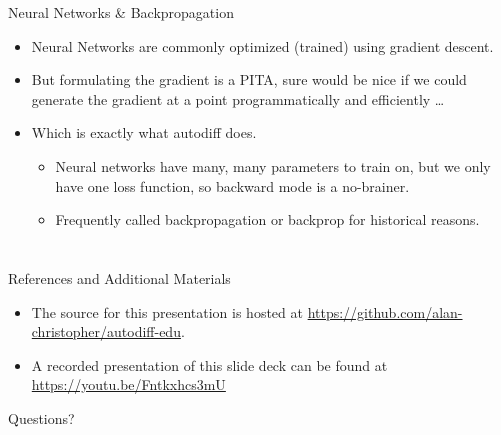 \documentclass[pdf]{beamer}
\makeatletter
\def\beamer@writeslidentry@miniframesoff{%
  \expandafter\beamer@ifempty\expandafter{\beamer@framestartpage}{}%
  {%
    \clearpage\beamer@notesactions%
  }
}
\newcommand*{\miniframesoff}{\let\beamer@writeslidentry=\beamer@writeslidentry@miniframesoff}
\makeatother
\begin{document}
\begin{frame}{Neural Networks \& Backpropagation}
  \begin{itemize}
  \item Neural Networks are commonly optimized (trained) using gradient descent.
    \pause
  \item But formulating the gradient is a PITA, sure would be nice if we could
    generate the gradient at a point programmatically and efficiently \ldots
    \pause
  \item Which is exactly what autodiff does.
    \begin{itemize}
    \item Neural networks have many, many parameters to train on, but we only
      have one loss function, so backward mode is a no-brainer.
    \item Frequently called backpropagation or backprop for historical reasons.
    \end{itemize}
  \end{itemize}
\end{frame}

\miniframesoff
\section*{}
\begin{frame}{References and Additional Materials}
  \begin{itemize}
  \item The source for this presentation is hosted at
    \url{https://github.com/alan-christopher/autodiff-edu}.
  \item A recorded presentation of this slide deck can be found at
    \url{https://youtu.be/Fntkxhcs3mU}
  \end{itemize}
\end{frame}

\begin{frame}{Questions?}
\end{frame}
\end{document}
